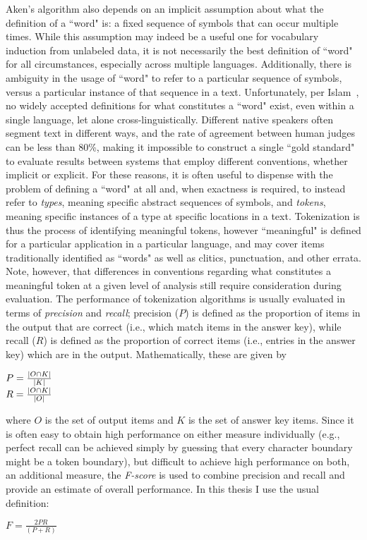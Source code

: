 Aken's algorithm also depends on an implicit assumption about what the definition of a ``word" is: a fixed sequence of symbols that can occur multiple times. While this assumption may indeed be a useful one for vocabulary induction from unlabeled data, it is not necessarily the best definition of ``word" for all circumstances, especially across multiple languages. Additionally, there is ambiguity in the usage of ``word" to refer to a particular sequence of symbols, versus a particular instance of that sequence in a text. Unfortunately, per Islam~\cite{islam07}, no widely accepted definitions for what constitutes a ``word" exist, even within a single language, let alone cross-linguistically. Different native speakers often segment text in different ways, and the rate of agreement between human judges can be less than 80\%, making it impossible to construct a single ``gold standard" to evaluate results between systems that employ different conventions, whether implicit or explicit. For these reasons, it is often useful to dispense with the problem of defining a ``word" at all and, when exactness is required, to instead refer to \textit{types}, meaning specific abstract sequences of symbols, and \textit{tokens}, meaning specific instances of a type at specific locations in a text. Tokenization is thus the process of identifying meaningful tokens, however ``meaningful" is defined for a particular application in a particular language, and may cover items traditionally identified as ``words" as well as clitics, punctuation, and other errata. Note, however, that differences in conventions regarding what constitutes a meaningful token at a given level of analysis still require consideration during evaluation. The performance of tokenization algorithms is usually evaluated in terms of \textit{precision} and \textit{recall}; precision ($P$) is defined as the proportion of items in the output that are correct (i.e., which match items in the answer key), while recall ($R$) is defined as the proportion of correct items (i.e., entries in the answer key) which are in the output. Mathematically, these are given by
\begin{center}
	$P = \frac{\left|O \cap K\right|}{\left|K\right|}$ \\
	$R = \frac{\left|O \cap K\right|}{\left|O\right|}$
\end{center}
where $O$ is the set of output items and $K$ is the set of answer key items. Since it is often easy to obtain high performance on either measure individually (e.g., perfect recall can be achieved simply by guessing that every character boundary might be a token boundary), but difficult to achieve high performance on both, an additional measure, the \textit{F-score} is used to combine precision and recall and provide an estimate of overall performance. In this thesis I use the usual definition:
\begin{center}
	$F = \frac{2PR}{(P + R)}$
\end{center}

